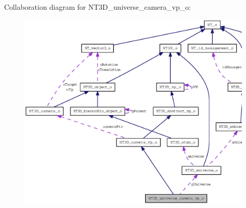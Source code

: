 Collaboration diagram for NT3D\_\-universe\_\-camera\_\-vp\_\-o:
\nopagebreak
\begin{figure}[H]
\begin{center}
\leavevmode
\includegraphics[width=400pt]{class_n_t3_d__universe__camera__vp__o__coll__graph}
\end{center}
\end{figure}
